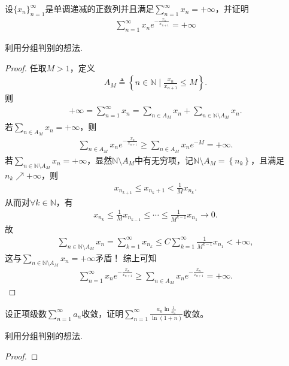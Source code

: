 \documentclass[../../main.tex]{subfiles}%
\begin{document}
\begin{example}
设$\{ x_n \}_{n=1}^{\infty}$是单调递减的正数列并且满足$\sum_{n=1}^{\infty} x_n = +\infty$，并证明
\begin{align*}
\sum_{n=1}^{\infty} x_n e^{-\frac{x_n}{x_{n+1}}} = +\infty
\end{align*}
\end{example}
\begin{note}
利用分组判别的想法.
\end{note}
\begin{proof}
任取$M>1$，定义
\begin{align*}
A_M\triangleq \left\{ n\in \mathbb{N} \mid \frac{x_n}{x_{n+1}}\leqslant M \right\} .
\end{align*}
则
\begin{align*}
+\infty =\sum_{n=1}^{\infty}{x_n}=\sum_{n\in A_M}{x_n}+\sum_{n\in \mathbb{N} \setminus A_M}{x_n}.
\end{align*}
若$\sum_{n\in A_M}{x_n}=+\infty$，则
\begin{align*}
\sum_{n\in A_M}{x_ne^{-\frac{x_n}{x_{n+1}}}}\geqslant \sum_{n\in A_M}{x_ne^{-M}}=+\infty .
\end{align*}
若$\sum_{n\in \mathbb{N} \setminus A_M}{x_n}=+\infty$，显然$\mathbb{N} \setminus A_M$中有无穷项，记$\mathbb{N} \setminus A_M=\left\{ n_k \right\}$，且满足$n_k\nearrow +\infty$，则
\begin{align*}
x_{n_{k+1}}\leqslant x_{n_k+1}<\frac{1}{M}x_{n_k}.
\end{align*}
从而对$\forall k\in \mathbb{N}$，有
\begin{align*}
x_{n_k}\leqslant \frac{1}{M}x_{n_{k-1}}\leqslant \cdots \leqslant \frac{1}{M^{k-1}}x_{n_1}\rightarrow 0.
\end{align*}
故
\begin{align*}
\sum_{n\in \mathbb{N} \setminus A_M}{x_n}=\sum_{k=1}^{\infty}{x_{n_k}}\leqslant C\sum_{k=1}^{\infty}{\frac{1}{M^{k-1}}x_{n_1}}<+\infty ,
\end{align*}
这与$\sum_{n\in \mathbb{N} \setminus A_M}{x_n}=+\infty$矛盾！
综上可知
\begin{align*}
\sum_{n=1}^{\infty}{x_ne^{-\frac{x_n}{x_{n+1}}}}\geqslant \sum_{n\in A_M}{x_ne^{-\frac{x_n}{x_{n+1}}}}=+\infty .
\end{align*}
\end{proof}

\begin{example}
设正项级数$\sum_{n=1}^{\infty} a_n$收敛，证明$\sum_{n=1}^{\infty} \frac{a_n \ln \frac{1}{a_n}}{\ln (1 + n)}$收敛。
\end{example}
\begin{note}
利用分组判别的想法.
\end{note}
\begin{proof}
\end{proof}
\end{document}
